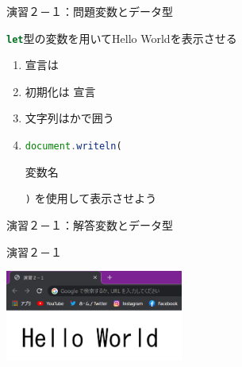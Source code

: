 \documentclass[dvipdfmx]{beamer}
\begin{document}
  \begin{frame}{演習２－１：問題}{変数とデータ型}
    \label{ensyu2-1}
    \begin{Large}\lstinline[language=javascript]|let|型の変数を用いて{\color{string}Hello World}を表示させる\end{Large}
    \begin{enumerate}
      \setlength{\itemsep}{5mm}
      \item \alert{宣言}は 
      \item \alert{初期化}は 宣言 
      \item 文字列はかで囲う
      \item \lstinline[language=javascript]|document.writeln(|{\color{string}\begin{footnotesize}変数名\end{footnotesize}}\lstinline[language=javascript]|)|
      を使用して表示させよう
    \end{enumerate}
  \end{frame}

  \begin{frame}{演習２－１：解答}{変数とデータ型}
    \begin{exampleblock}{演習２－１}
      
    \end{exampleblock}
    \vspace{5mm}
    \centering
    \includegraphics[height=3cm]{pic/Chap2/pic2.png}
  \end{frame}
\end{document}
